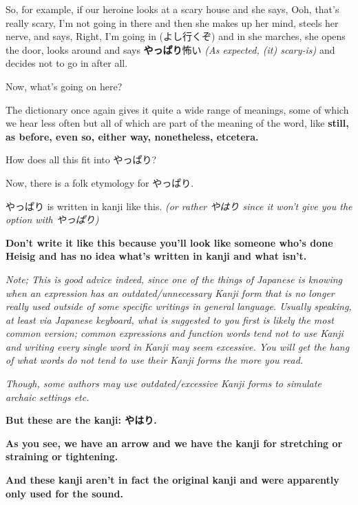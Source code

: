 So, for example, if our heroine looks at a scary house and she says, Ooh, that's really scary, I'm not going in there and then she makes up her mind, steels her nerve, and says, Right, I'm going in (よし行くぞ) and in she marches, she opens the door, looks around and says {\bf やっぱり}怖い {\em (As expected, (it) scary-is)} and decides not to go in after all.

{}

Now, what's going on here?

The dictionary once again gives it quite a wide range of meanings, some of which we hear less often but all of which are part of the meaning of the word, like {\bf still, as before, even so, either way, nonetheless, etcetera.}

{}

How does all this fit into やっぱり?

Now, there is a folk etymology for やっぱり.

やっぱり is written in kanji like this.\crlf
{\em (or rather やはり since it won't give you the option with やっぱり)}

{}

{\bf Don't write it like this because you'll look like someone who's done Heisig and has no idea what's written in kanji and what isn't.}

{\em Note; This is good advice indeed, since one of the things of Japanese is knowing when an expression has an outdated/unnecessary Kanji form that is no longer really used outside of some specific writings in general language. Usually speaking, at least via Japanese keyboard, what is suggested to you first is likely the most common version; common expressions and function words tend not to use Kanji and writing every single word in Kanji may seem excessive. You will get the hang of what words do not tend to use their Kanji forms the more you read.}

{\em Though, some authors may use outdated/excessive Kanji forms to simulate archaic settings etc.}

{\bf But these are the kanji: やはり.}

{\bf As you see, we have an arrow and we have the kanji for stretching or straining or tightening.}

\thinrule

{\bf And these kanji aren't in fact the original kanji and were apparently only used for the sound.}


